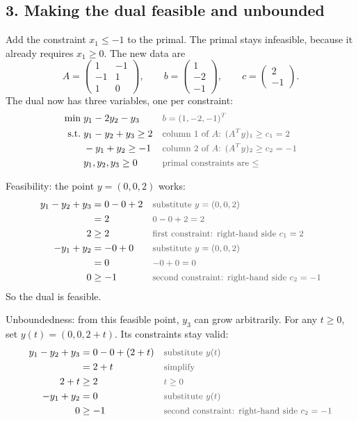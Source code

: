 \documentclass[a4paper,11pt]{article}
\newif\ifexplain
\newcommand{\teil}[1]{\subsection*{#1}}
\newcommand{\why}[1]{\text{\small\color{black!65}#1}}
\newcommand{\explain}[1]{\ifexplain\begin{erklbox}#1\end{erklbox}\fi}
\begin{document}
\teil{3. Making the dual feasible and unbounded}
Add the constraint $x_1 \le -1$ to the primal. The primal stays infeasible, because it already requires $x_1 \ge 0$. The new data are
\[
A = \begin{pmatrix}1&-1\\-1&1\\1&0\end{pmatrix},\qquad b=\begin{pmatrix}1\\-2\\-1\end{pmatrix},\qquad c=\begin{pmatrix}2\\-1\end{pmatrix}.
\]
The dual now has three variables, one per constraint:
\begin{align*}
\min\;& y_1 - 2y_2 - y_3 && \why{$b=(1,-2,-1)^T$}\\
\text{s.t.}\;& y_1 - y_2 + y_3 \ge 2 && \why{column 1 of $A$: $(A^Ty)_1 \ge c_1 = 2$}\\
& -y_1 + y_2 \ge -1 && \why{column 2 of $A$: $(A^Ty)_2 \ge c_2 = -1$}\\
& y_1, y_2, y_3 \ge 0 && \why{primal constraints are $\le$}
\end{align*}
\explain{Die dritte Nebenbedingung $x_1\le-1$ bringt eine dritte duale Variable $y_3\ge0$ mit dem Koeffizienten $-1$ in der Zielfunktion und der Spalte $(1,0)^T$ in $A^T$. Dadurch bekommt die erste duale Nebenbedingung den Zusatzterm $+y_3$, der sie erfüllbar macht.}
Feasibility: the point $y=(0,0,2)$ works:
\begin{align*}
y_1 - y_2 + y_3 &= 0 - 0 + 2 && \why{substitute $y=(0,0,2)$}\\
&= 2 && \why{$0-0+2=2$}\\
2 &\ge 2 && \why{first constraint: right-hand side $c_1=2$}\\
-y_1 + y_2 &= -0 + 0 && \why{substitute $y=(0,0,2)$}\\
&= 0 && \why{$-0+0=0$}\\
0 &\ge -1 && \why{second constraint: right-hand side $c_2=-1$}
\end{align*}
So the dual is feasible.
\explain{Der Punkt $(0,0,2)$ macht genau die erste Nebenbedingung scharf: $y_3=2$ gleicht aus, dass $y_1-y_2=0$ ist. Die zweite Nebenbedingung ist mit $0\ge-1$ locker erfüllt.}
Unboundedness: from this feasible point, $y_3$ can grow arbitrarily. For any $t \ge 0$, set $y(t)=(0,0,2+t)$. Its constraints stay valid:
\begin{align*}
y_1 - y_2 + y_3 &= 0 - 0 + (2+t) && \why{substitute $y(t)$}\\
&= 2 + t && \why{simplify}\\
2 + t &\ge 2 && \why{$t \ge 0$}\\
-y_1 + y_2 &= 0 && \why{substitute $y(t)$}\\
0 &\ge -1 && \why{second constraint: right-hand side $c_2=-1$}
\end{align*}
\end{document}
